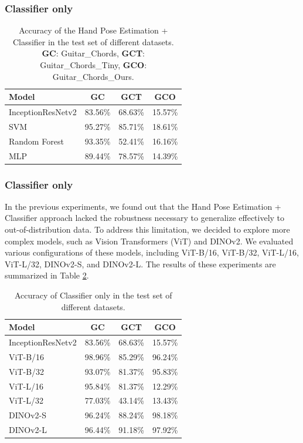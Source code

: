 \documentclass[10pt,twocolumn,letterpaper]{article}
\begin{document}
\subsubsection{Classifier only}




\begin{table}[h]
  \centering
  \begin{tabular}{lccc}
    \toprule
    \textbf{Model} & \textbf{GC} & \textbf{GCT} & \textbf{GCO} \\
    \midrule
 InceptionResNetv2 & 83.56\% & 68.63\% & 15.57\% \\
    \midrule
 SVM & 95.27\% & 85.71\% & 18.61\% \\
 Random Forest & 93.35\% & 52.41\% & 16.16\%  \\
 MLP & 89.44\% & 78.57\% & 14.39\% \\
    \bottomrule
  \end{tabular}
  \caption{Accuracy of the Hand Pose Estimation + Classifier in the test set of different datasets. \textbf{GC}: Guitar\_Chords, \textbf{GCT}: Guitar\_Chords\_Tiny, \textbf{GCO}: Guitar\_Chords\_Ours.}
  \label{tab:handpose-classifier-results}
\end{table}

\subsubsection{Classifier only}
In the previous experiments, we found out that the Hand Pose Estimation + Classifier approach lacked the robustness necessary to generalize effectively to out-of-distribution data. To address this limitation, we decided to explore more complex models, such as Vision Transformers (ViT) and DINOv2. We evaluated various configurations of these models, including ViT-B/16, ViT-B/32, ViT-L/16, ViT-L/32, DINOv2-S, and DINOv2-L. The results of these experiments are summarized in Table \ref{tab:transformer-models-results}.

\begin{table}[h]
  \centering
  \begin{tabular}{lccc}
    \toprule
    \textbf{Model} & \textbf{GC} & \textbf{GCT} & \textbf{GCO} \\
    \midrule
    InceptionResNetv2 & 83.56\% & 68.63\% & 15.57\% \\
    \midrule
    ViT-B/16 & 98.96\% & 85.29\% & 96.24\% \\
    ViT-B/32 & 93.07\% & 81.37\% & 95.83\% \\
    ViT-L/16 & 95.84\% & 81.37\% & 12.29\% \\
    ViT-L/32 & 77.03\% & 43.14\% & 13.43\% \\
    DINOv2-S & 96.24\% & 88.24\% & 98.18\% \\
    DINOv2-L & 96.44\% & 91.18\% & 97.92\% \\
    \bottomrule
  \end{tabular}
  \caption{Accuracy of Classifier only in the test set of different datasets.}
  \label{tab:transformer-models-results}
\end{table}
\end{document}
